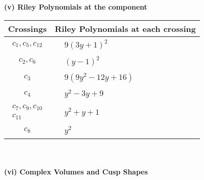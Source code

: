 \documentclass[1p]{elsarticle_modified}
\theoremstyle{definition}
\begin{document}
\newpage\renewcommand{\arraystretch}{1}
\flushleft \textbf{(v) Riley Polynomials at the component}\newline \\
\begin{tabular}{m{50pt}|m{274pt}}
Crossings & \hspace{64pt}Riley Polynomials at each crossing \\
\hline $$\begin{aligned}c_{1},c_{5},c_{12}\end{aligned}$$&$\begin{aligned}
&9(3 y+1)^2
\end{aligned}$\\
\hline $$\begin{aligned}c_{2},c_{6}\end{aligned}$$&$\begin{aligned}
&(y-1)^2
\end{aligned}$\\
\hline $$\begin{aligned}c_{3}\end{aligned}$$&$\begin{aligned}
&9(9 y^2-12 y+16)
\end{aligned}$\\
\hline $$\begin{aligned}c_{4}\end{aligned}$$&$\begin{aligned}
&y^2-3 y+9
\end{aligned}$\\
\hline $$\begin{aligned}c_{7},c_{9},c_{10}\\c_{11}\end{aligned}$$&$\begin{aligned}
&y^2+y+1
\end{aligned}$\\
\hline $$\begin{aligned}c_{8}\end{aligned}$$&$\begin{aligned}
&y^2
\end{aligned}$\\
\hline
\end{tabular}\\~\\
\newpage\flushleft \textbf{(vi) Complex Volumes and Cusp Shapes}
\end{document}
